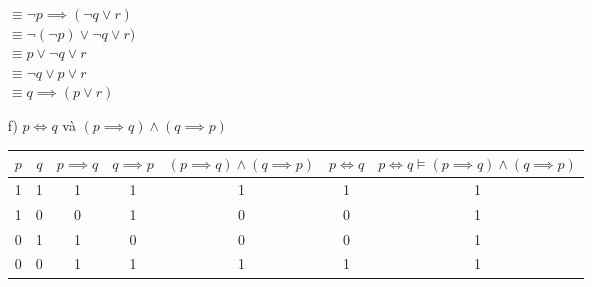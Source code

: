 \documentclass[a4paper]{article}
\begin{document}
\begin{enumerate}
				$\equiv  \lnot p \implies (\lnot q \lor r)$\\
				$\equiv  \lnot (\lnot p) \lor \lnot q \lor r)$\\
				$\equiv p \lor \lnot q \lor r$\\
				$\equiv  \lnot q \lor p \lor r $\\
				$\equiv  q \implies (p \lor r)$\\
	\item[f)] $p \iff q $ và $ (p \implies q) \land (q \implies p)$
	\begin{table} [h]
		\centering
		\begin{tabular} {|c|c|c|c|c|c|c|}
			\hline
			$p$&$q$&$p \implies q$&$q \implies p$&$(p \implies q) \land (q \implies p)$ &$p \iff q$ &$p \iff q \vDash (p \implies q) \land (q \implies p)$\\
			\hline
			1&1&1&1&1&1&1\\
			1&0&0&1&0&0&1\\
			0&1&1&0&0&0&1\\
			0&0&1&1&1&1&1\\
			\hline
		\end{tabular}
	\end{table}
\end{enumerate}
\clearpage
\end{document}
